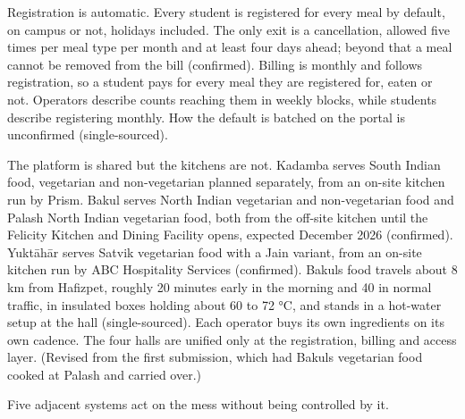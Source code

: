 \documentclass[
  10pt,
  table]{article}
\begin{document}
Registration is automatic. Every student is registered for every meal by default, on campus or not, holidays included. The only exit is a cancellation, allowed five times per meal type per month and at least four days ahead; beyond that a meal cannot be removed from the bill (confirmed). Billing is monthly and follows registration, so a student pays for every meal they are registered for, eaten or not. Operators describe counts reaching them in weekly blocks, while students describe registering monthly. How the default is batched on the portal is unconfirmed (single-sourced).

The platform is shared but the kitchens are not. Kadamba serves South Indian food, vegetarian and non-vegetarian planned separately, from an on-site kitchen run by Prism. Bakul serves North Indian vegetarian and non-vegetarian food and Palash North Indian vegetarian food, both from the off-site kitchen until the Felicity Kitchen and Dining Facility opens, expected December 2026 (confirmed). Yuktāhār serves Satvik vegetarian food with a Jain variant, from an on-site kitchen run by ABC Hospitality Services (confirmed). Bakul\textquotesingle s food travels about 8 km from Hafizpet, roughly 20 minutes early in the morning and 40 in normal traffic, in insulated boxes holding about 60 to 72 °C, and stands in a hot-water setup at the hall (single-sourced). Each operator buys its own ingredients on its own cadence. The four halls are unified only at the registration, billing and access layer. (Revised from the first submission, which had Bakul\textquotesingle s vegetarian food cooked at Palash and carried over.)

Five adjacent systems act on the mess without being controlled by it.
\end{document}
